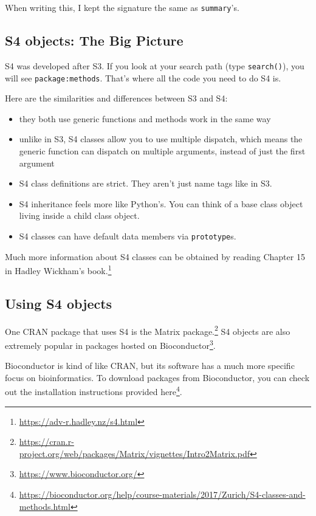\documentclass[
  12pt,
]{krantz}
\providecommand{\tightlist}{%
  \setlength{\itemsep}{0pt}\setlength{\parskip}{0pt}}
\renewcommand{\href}[2]{#2\footnote{\url{#1}}}
\begin{document}
When writing this, I kept the signature the same as \texttt{summary}'s.

\hypertarget{s4-objects-the-big-picture}{%
\subsection{S4 objects: The Big Picture}\label{s4-objects-the-big-picture}}

S4 was developed after S3. If you look at your search path (type \texttt{search()}), you will see \texttt{package:methods}. That's where all the code you need to do S4 is.

Here are the similarities and differences between S3 and S4:

\begin{itemize}
\tightlist
\item
  they both use generic functions and methods work in the same way
\item
  unlike in S3, S4 classes allow you to use multiple dispatch, which means the generic function can dispatch on multiple arguments, instead of just the first argument
\item
  S4 class definitions are strict. They aren't just name tags like in S3.
\item
  S4 inheritance feels more like Python's. You can think of a base class object living inside a child class object.
\item
  S4 classes can have default data members via \texttt{prototype}s.
\end{itemize}

Much more information about S4 classes can be obtained by reading \href{https://adv-r.hadley.nz/s4.html}{Chapter 15 in Hadley Wickham's book.}

\hypertarget{using-s4-objects}{%
\subsection{Using S4 objects}\label{using-s4-objects}}

One CRAN package that uses S4 is the \href{https://cran.r-project.org/web/packages/Matrix/vignettes/Intro2Matrix.pdf}{Matrix package.} S4 objects are also extremely popular in packages hosted on \href{https://www.bioconductor.org/}{Bioconductor}.

Bioconductor is kind of like CRAN, but its software has a much more specific focus on bioinformatics. To download packages from Bioconductor, you can check out the installation instructions provided \href{https://bioconductor.org/help/course-materials/2017/Zurich/S4-classes-and-methods.html}{here}.
\end{document}
